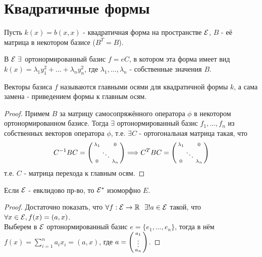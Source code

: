 \section{Квадратичные формы}
Пусть $k(x) = b(x,x)$ - квадратичная форма на пространстве $\mathcal{E}$, $B$ - её матрица в некотором базисе ($B^T = B$).
\begin{theorem}
    В $\mathcal{E} \ \exists$ ортонормированный базис $f = eC$, в котором эта форма имеет вид $k(x) = \lambda_1y_1^2 + ... + \lambda_n y_n^2$, где $\lambda_1,...,\lambda_n$ - собственные значения $B$.
\end{theorem}
\begin{remark}
    Векторы базиса $f$ называются главными осями для квадратичной формы $k$, а сама замена - приведением формы к главным осям. 
\end{remark}
\begin{proof}
    Примем $B$ за матрицу самосопряжённого оператора $\phi$ в некотором ортонормированном базисе. Тогда $\exists$ ортонормированный базис $f_1,...,f_n$ из собственных векторов оператора $\phi$, т.е. $\exists C$ - ортогональная матрица такая, что
    $$C^{-1}BC = \begin{psmallmatrix}  \lambda_1&\null&0 \\ \null&\ddots&\null \\ 0&\null&\lambda_n \end{psmallmatrix} \Longrightarrow C^TBC = \begin{psmallmatrix}  \lambda_1&\null&0 \\ \null&\ddots&\null \\ 0&\null&\lambda_n \end{psmallmatrix}$$
    т.е. $C$ - матрица перехода к главным осям. 
\end{proof}
\begin{subtheorem}
    Если $\mathcal{E}$ - евклидово пр-во, то $\mathcal{E}^*$ изоморфно $E$.
\end{subtheorem}
\begin{proof}
    Достаточно показать, что $\forall f: \mathcal{E} \rightarrow \mathbb{R} \ \ \exists! a \in \mathcal{E}$ такой, что $\forall x \in \mathcal{E}, f(x) = (a, x)$.\\
    Выберем в $\mathcal{E}$ ортонормированный базис $e = \{e_1,...,e_n\}$, тогда в нём $f(x) = \sum \limits_{i=1}^n a_ix_i = (a, x)$, где $a = \begin{psmallmatrix} a_1 \\ \vdots \\ a_n \end{psmallmatrix}$.
\end{proof}
